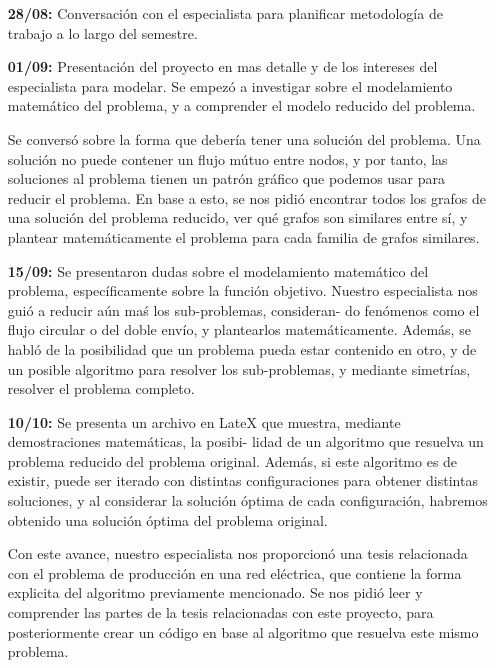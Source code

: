 \documentclass[12pt,twoside]{article}
\begin{document}
	\begin{enumerate}
		\item [\textbf{28/08:}] Conversaci\'on con el especialista para planificar metodolog\'ia de trabajo a lo largo del semestre.
		
		\item [\textbf{01/09:}] Presentaci\'on del proyecto en mas detalle y de los intereses del especialista para modelar. Se empez\'o a investigar sobre el modelamiento matem\'atico del problema, y a comprender el modelo reducido del problema.
		
		Se convers\'o sobre la forma que deber\'ia tener una soluci\'on del problema. Una soluci\'on no puede contener un flujo m\'utuo entre nodos, y por tanto, las soluciones al problema tienen un patr\'on gr\'afico que podemos usar para reducir el problema. En base a esto, se nos pidi\'o encontrar todos los grafos de una soluci\'on del problema reducido, ver qu\'e grafos son similares entre s\'i, y plantear matem\'aticamente el problema para cada familia de grafos similares.
		
		\item [\textbf{15/09:}] Se presentaron dudas sobre el modelamiento matem\'atico del problema, espec\'ificamente sobre la funci\'on objetivo. Nuestro especialista nos gui\'o a reducir a\'un ma\'s los sub-problemas, consideran- do fen\'omenos como el flujo circular o del doble env\'io, y plantearlos matem\'aticamente. Adem\'as, se habl\'o de la posibilidad que un problema pueda estar contenido en otro, y de un posible algoritmo para resolver los sub-problemas, y mediante simetr\'ias, resolver el problema completo. 
		
		\item [\textbf{10/10:}] Se presenta un archivo en LateX que muestra, mediante demostraciones matem\'aticas, la posibi- lidad de un algoritmo que resuelva un problema reducido del problema original. Adem\'as, si este algoritmo es de existir, puede ser iterado con distintas configuraciones para obtener distintas soluciones, y al considerar la soluci\'on \'optima de cada configuraci\'on, habremos obtenido una soluci\'on \'optima del problema original.
		
		Con este avance, nuestro especialista nos proporcion\'o una tesis relacionada con el problema de producci\'on en una red el\'ectrica, que contiene la forma explicita del algoritmo previamente mencionado. Se nos pidi\'o leer y comprender las partes de la tesis relacionadas con este proyecto, para posteriormente crear un c\'odigo en base al algoritmo que resuelva este mismo problema.
		

\end{enumerate}
\end{document}
